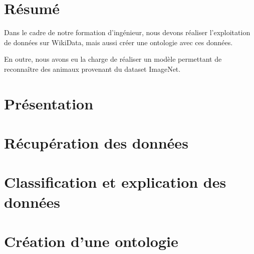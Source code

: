 \documentclass{librairies/lib}
\begin{document}
    


    \newpage
    \pagestyle{no_number}
    \section*{Résumé}


    Dans le cadre de notre formation d’ingénieur, nous devons réaliser l’exploitation de données sur WikiData, mais aussi créer une ontologie avec ces données. 


    En outre, nous avons eu la charge de réaliser un modèle permettant de reconnaître des animaux provenant du dataset ImageNet\cite{imageNet}.




    \newpage



    \tableofcontents
    \newpage



    \pagestyle{number}
    
    \section{Présentation}\label{sec:presentation}
    
    

    \newpage


    \section{Récupération des données}\label{sec:donnee}
    
    

    \newpage


    \section{Classification et explication des données}\label{sec:modele}
    
    

    \newpage


    \section{Création d’une ontologie}\label{sec:onto}
    
\end{document}
